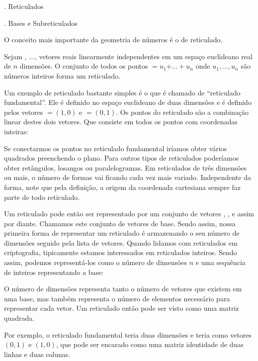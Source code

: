 
{\twelvebold {}. Reticulados}


\vskip0.5cm

{\tenbold{}. Bases e Subreticulados}

O conceito mais importante da geometria de números é o de reticulado.

Sejam , $\ldots$,  vetores reais linearmente
independentes em um espaço euclideano real de $n$ dimensões. O
conjunto de todos os pontos
$=u_1$$+\ldots+u_n$ onde $u_1, \ldots,
u_n$ são números inteiros forma um reticulado.

Um exemplo de reticulado bastante simples é o que é chamado de
``reticulado fundamental''. Ele é definido no espaço euclideano de
duas dimensões e é definido pelos vetores $=(1, 0)$ e
$=(0,1)$. Os pontos do reticulado são a combinação linear
destes dois vetores. Que consiste em todos os pontos com coordenadas
inteiras:


Se conectarmos os pontos no reticulado fundamental iríamos obter
vários quadrados preenchendo o plano. Para outros tipos de reticulados
poderíamos obter retângulos, losangos ou paralelogramas. Em
reticulados de três dimensões ou mais, o número de formas vai ficando
cada vez mais variado. Independente da forma, note que pela definição,
a origem da coordenada cartesiana sempre faz parte de todo reticulado.

Um reticulado pode então ser representado por um conjunto de vetores
, , e assim por diante. Chamamos este conjunto de
vetores de base. Sendo assim, nossa primeira forma de representar um
reticulado é armazenando o seu número de dimensões seguido pela lista
de vetores. Quando lidamos com reticulados em criptografia,
tipicamente estamos interessados em reticulados inteiros. Sendo assim,
podemos representá-los como o número de dimensões $n$ e uma sequência
de inteiros representando a base:


O número de dimensões representa tanto o número de vetores que existem
em uma base, mas também representa o número de elementos necessário
para representar cada vetor. Um reticulado então pode ser visto como
uma matriz quadrada.

Por exemplo, o reticulado fundamental teria duas dimensões e teria
como vetores $(0, 1)$ e $(1, 0)$, que pode ser encarado como uma
matriz identidade de duas linhas e duas colunas.

